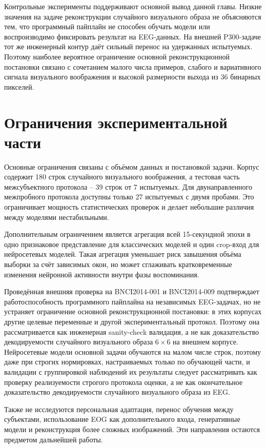 Контрольные эксперименты поддерживают основной вывод данной главы. Низкие
значения на задаче реконструкции случайного визуального образа не объясняются
тем, что программный пайплайн не способен обучать модели или воспроизводимо
фиксировать результат на EEG-данных. На внешней P300-задаче тот же
инженерный контур даёт сильный перенос на удержанных испытуемых. Поэтому
наиболее вероятное ограничение основной реконструкционной постановки связано
с сочетанием малого числа примеров, слабого и вариативного сигнала визуального
воображения и высокой размерности выхода из 36 бинарных пикселей.

\section{Ограничения экспериментальной части}

Основные ограничения связаны с объёмом данных и постановкой задачи. Корпус
содержит 180 строк случайного визуального воображения, а тестовая часть
межсубъектного протокола -- 39 строк от 7 испытуемых. Для двунаправленного
межпробного протокола доступны только 27
испытуемых с двумя пробами. Это ограничивает мощность статистических проверок
и делает небольшие различия между моделями нестабильными.

Дополнительным ограничением является агрегация всей 15-секундной эпохи в одно
признаковое представление для классических моделей и один crop-вход для
нейросетевых моделей. Такая агрегация уменьшает риск завышения объёма выборки
за счёт зависимых окон, но может сглаживать кратковременные изменения
нейронной активности внутри фазы воспоминания.

Проведённая внешняя проверка на BNCI2014-001 и BNCI2014-009 подтверждает
работоспособность программного пайплайна на независимых EEG-задачах, но не
устраняет ограничение основной реконструкционной постановки: в этих корпусах
другие целевые переменные и другой экспериментальный протокол. Поэтому она
рассматривается как инженерная sanity-check валидация, а не как доказательство
декодируемости случайного визуального образа $6 \times 6$ на внешнем корпусе.
Нейросетевые модели основной задачи обучаются на малом числе строк, поэтому
даже при строгих нормировках, настраиваемых только по обучающей части, и
валидации с группировкой наблюдений их результаты следует рассматривать как
проверку реализуемости строгого протокола оценки, а не как окончательное
доказательство декодируемости случайного визуального образа из EEG.

Также не исследуются персональная адаптация, перенос обучения между
субъектами, использование EOG как дополнительного входа, генеративные модели
и реконструкция более сложных изображений. Эти направления остаются
предметом дальнейшей работы.
